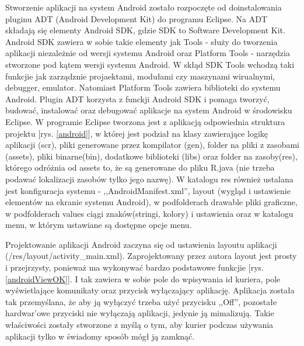 \documentclass[eng,printmode,oneside]{mgr}
\begin{document}
Stworzenie aplikacji na system Android zostało rozpoczęte od doinstalowania
pluginu ADT (Android Development Kit) do programu Eclipse. Na ADT składają się
elementy Android SDK, gdzie SDK to Software Development Kit. Android SDK
zawiera w sobie takie elementy jak Tools - służy do tworzenia aplikacji niezależnie od
wersji systemu Android oraz Platform Tools - narzędzia stworzone pod kątem
wersji systemu Android. W skłąd SDK Tools wchodzą taki funkcjie jak zarządznie
projaektami, modułami czy maszynami wirualnymi, debugger, emulator. Natomiast
Platform Tools zawiera biblioteki do systemu Android. Plugin ADT  korzysta
z funckji Android SDK i pomaga tworzyć, budować, instalować oraz debugować
aplikacje na system Android w środowisku Eclipse. W programie Eclipse tworzona
jest z aplikacją odpowiednia struktura projektu [rys. \ref{android}], w której
jest podział na klasy zawierające logikę aplikacji (scr), pliki generowane przez kompilator (gen),
folder na pliki z zasobami (assets), pliki binarne(bin), dodatkowe biblioteki
(libs) oraz folder na zasoby(res), którego odróżnia od assets to, że są
generowane do pliku R.java (nie trzeba podawać lokalizacji zasobów tylko jego
nazwę). W katalogu res również ustalana jest konfiguracja systemu - 
,,AndroidManifest.xml'', layout (wygląd i ustawienie elementów na ekranie
systemu Android), w podfolderach drawable pliki graficzne, w podfolderach values
ciągi znaków(stringi, kolory) i ustawienia oraz w katalogu menu, w którym
ustawiane są dostępne opcje menu.

Projektowanie aplikacji Android zaczyna się od ustawienia layoutu aplikacji
(/res/layout/activity\_main.xml). Zaprojektowany przez autora layout jest
prosty i przejrzysty, ponieważ ma wykonywać bardzo podstawowe funkcjie [rys.
\ref{androidViewOK}]. I tak zawiera w sobie pole do wpisywania id kuriera,
pole wyświetlające komunikaty oraz przycisk wyłączający aplikację. Aplikacja została
tak przemyślana, że aby ją wyłączyć trzeba użyć przycisku ,,Off'', pozostałe hardwar'owe przyciski
nie wyłączają aplikacji, jedynie ją mimalizują. Takie właściwości zostały
stworzone z myślą o tym, aby kurier podczas używania aplikacji tylko w świadomy
sposób mógł ją zamknąć.
\end{document}
